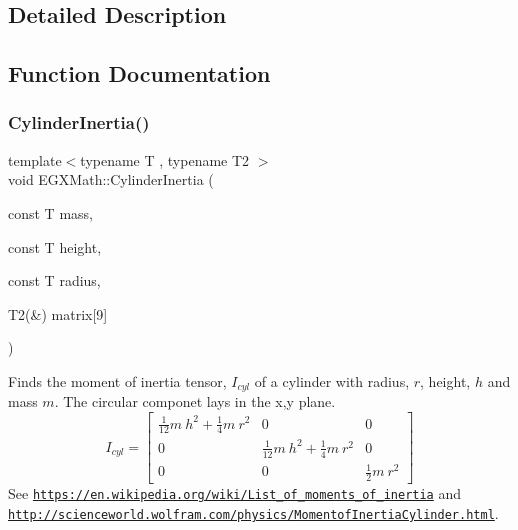 \subsection{Detailed Description}


\subsection{Function Documentation}
\mbox{\label{group___e_g_x_math-_geometry-3_d-_cylinder_gae7dca080058b400feb0d69f78af7a850}} 
\subsubsection{\texorpdfstring{Cylinder\+Inertia()}{CylinderInertia()}\hspace{0.1cm}{\footnotesize\ttfamily [1/3]}}
{\footnotesize\ttfamily template$<$typename T , typename T2 $>$ \\
void E\+G\+X\+Math\+::\+Cylinder\+Inertia (\begin{DoxyParamCaption}\item[{const T}]{mass,  }\item[{const T}]{height,  }\item[{const T}]{radius,  }\item[{T2(\&)}]{matrix\mbox{[}9\mbox{]} }\end{DoxyParamCaption})}



Finds the moment of inertia tensor, $I_{cyl}$ of a cylinder with radius, $r$, height, $h$ and mass $m$. The circular componet lays in the x,y plane. \[ I_{cyl}=\begin{bmatrix} \frac{1}{12}m\ h^2 + \frac{1}{4}m\ r^2 & 0 & 0\\ 0 & \frac{1}{12}m\ h^2 + \frac{1}{4}m\ r^2 & 0\\ 0 & 0 & \frac{1}{2}m\ r^2 \end{bmatrix} \] See \href{https://en.wikipedia.org/wiki/List_of_moments_of_inertia}{\tt https\+://en.\+wikipedia.\+org/wiki/\+List\+\_\+of\+\_\+moments\+\_\+of\+\_\+inertia} and \href{http://scienceworld.wolfram.com/physics/MomentofInertiaCylinder.html}{\tt http\+://scienceworld.\+wolfram.\+com/physics/\+Momentof\+Inertia\+Cylinder.\+html}. 


